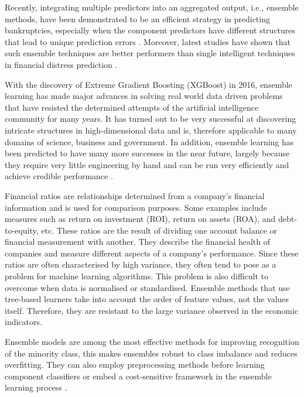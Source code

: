 Recently, integrating multiple predictors into an aggregated output, i.e., ensemble methods, have been demonstrated to be an efficient strategy in predicting bankruptcies, especially when the component predictors have different structures that lead to unique prediction errors \cite{breiman1996bagging}. Moreover, latest studies have shown that such ensemble techniques are better performers than single intelligent techniques in financial distress prediction \cite{deligianni2012forecasting,sun2012financial}.


With the discovery of Extreme Gradient Boosting (XGBoost) in 2016, ensemble learning has made major advances in solving real world data driven problems that have resisted the determined attempts of the artificial intelligence community for many years.
It has turned out to be very successful at discovering intricate structures in high-dimensional data and is, therefore applicable to many domains of science, business and government. In addition, ensemble learning has been predicted to have many more successes in the near future, largely because they require very little engineering by hand and can be run very efficiently and achieve credible performance \cite{chen2020ensemble}. 

Financial ratios are relationships determined from a company's financial information and is used for comparison purposes. Some examples include measures such as return on investment (ROI), return on assets (ROA), and debt-to-equity, etc. These ratios are the result of dividing one account balance or financial measurement with another. 
They describe the financial health of companies and measure different aspects of a company's performance. Since these ratios are often characterised by high variance, they often tend to pose as a problem for machine learning algorithms.
This problem is also difficult to overcome when data is normalised or standardised. 
Ensemble methods that use tree-based learners take into account the order of feature values, not the values itself. Therefore, they are resistant to the large variance observed in the economic indicators. 

Ensemble models are among the most effective methods for improving recognition of the minority class, this makes ensembles robust to class imbalance and reduces overfitting. They can also employ preprocessing methods before learning component classifiers or embed a cost-sensitive framework in the ensemble learning process \cite{blaszczynski2017actively}.


